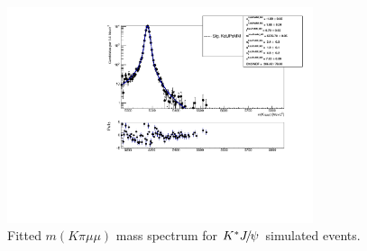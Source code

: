 \begin{figure}[h!]
\centering \includegraphics[width=0.8\textwidth]{RKst/figs/fit_MMs_0_MM-q2central-gmc/KstJPsMM_MC_log_fitAndRes.pdf}
\caption{Fitted $m(K\pi \mu\mu)$ mass spectrum for $\Kstar\jpsi$ simulated events. }
\label{fig:mumu_MC_fits}
\end{figure}

